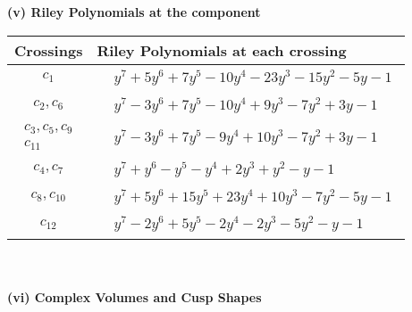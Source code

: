 \documentclass[1p]{elsarticle_modified}
\theoremstyle{definition}
\begin{document}
\newpage\renewcommand{\arraystretch}{1}
\flushleft \textbf{(v) Riley Polynomials at the component}\newline \\
\begin{tabular}{m{50pt}|m{274pt}}
Crossings & \hspace{64pt}Riley Polynomials at each crossing \\
\hline $$\begin{aligned}c_{1}\end{aligned}$$&$\begin{aligned}
&y^7+5 y^6+7 y^5-10 y^4-23 y^3-15 y^2-5 y-1
\end{aligned}$\\
\hline $$\begin{aligned}c_{2},c_{6}\end{aligned}$$&$\begin{aligned}
&y^7-3 y^6+7 y^5-10 y^4+9 y^3-7 y^2+3 y-1
\end{aligned}$\\
\hline $$\begin{aligned}c_{3},c_{5},c_{9}\\c_{11}\end{aligned}$$&$\begin{aligned}
&y^7-3 y^6+7 y^5-9 y^4+10 y^3-7 y^2+3 y-1
\end{aligned}$\\
\hline $$\begin{aligned}c_{4},c_{7}\end{aligned}$$&$\begin{aligned}
&y^7+y^6- y^5- y^4+2 y^3+y^2- y-1
\end{aligned}$\\
\hline $$\begin{aligned}c_{8},c_{10}\end{aligned}$$&$\begin{aligned}
&y^7+5 y^6+15 y^5+23 y^4+10 y^3-7 y^2-5 y-1
\end{aligned}$\\
\hline $$\begin{aligned}c_{12}\end{aligned}$$&$\begin{aligned}
&y^7-2 y^6+5 y^5-2 y^4-2 y^3-5 y^2- y-1
\end{aligned}$\\
\hline
\end{tabular}\\~\\
\newpage\flushleft \textbf{(vi) Complex Volumes and Cusp Shapes}
\end{document}
